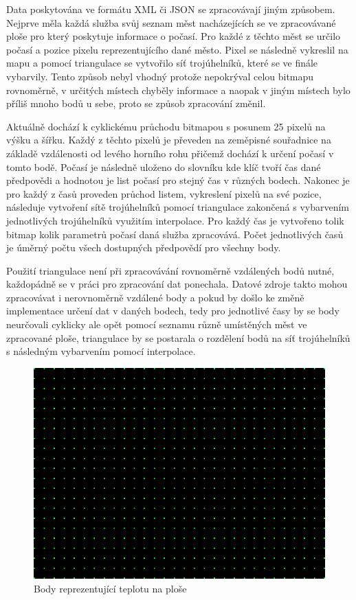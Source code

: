 \documentclass[czech,bachelor,dept460,male,csharp,cpdeclaration]{diploma}
\begin{document}
	Data poskytována ve formátu XML či JSON se zpracovávají jiným způsobem. Nejprve měla každá služba svůj seznam měst nacházejících se ve zpracovávané ploše pro který poskytuje informace o počasí. Pro každé z těchto měst se určilo počasí a 
	pozice pixelu reprezentujícího dané město. Pixel se následně vykreslil na mapu a pomocí triangulace se vytvořilo síť trojúhelníků, které se ve finále vybarvily. Tento způsob nebyl vhodný protože nepokrýval celou bitmapu rovnoměrně, v určitých místech chyběly informace a naopak v jiným místech bylo příliš mnoho bodů u sebe, proto se způsob zpracování změnil.
	
	Aktuálně dochází k cyklickému průchodu bitmapou s posunem 25 pixelů na výšku a šířku. Každý z těchto pixelů je převeden na zeměpisné souřadnice na základě vzdálenosti od levého horního rohu přičemž dochází k určení počasí v tomto bodě. Počasí je následně uloženo do slovníku kde klíč tvoří čas dané předpovědi a hodnotou je list počasí pro stejný čas v různých bodech. Nakonec je pro každý z časů proveden průchod listem, vykreslení pixelů na své pozice, následuje vytvoření sítě trojúhelníků pomocí triangulace zakončená s vybarvením jednotlivých trojúhelníků využitím interpolace. Pro každý čas je vytvořeno tolik bitmap kolik parametrů počasí daná služba zpracovává. Počet jednotlivých časů je úměrný počtu všech dostupných předpovědí pro všechny body.
	
	Použití triangulace není při zpracovávání rovnoměrně vzdálených bodů nutné, každopádně se v práci pro zpracování dat ponechala. Datové zdroje takto mohou zpracovávat i nerovnoměrně vzdálené body a pokud by došlo ke změně implementace určení dat v daných bodech, tedy pro jednotlivé časy by se body neurčovali cyklicky ale opět pomocí seznamu různě umístěných měst ve zpracované ploše, triangulace by se postarala o rozdělení bodů na síť trojúhelníků s následným vybarvením pomocí interpolace.
	
	\begin{figure}
		\centering
		\includegraphics[scale=0.5]{Data/bmp_body.png}
		\caption{Body reprezentující teplotu na ploše}
	\end{figure}
	
\end{document}
